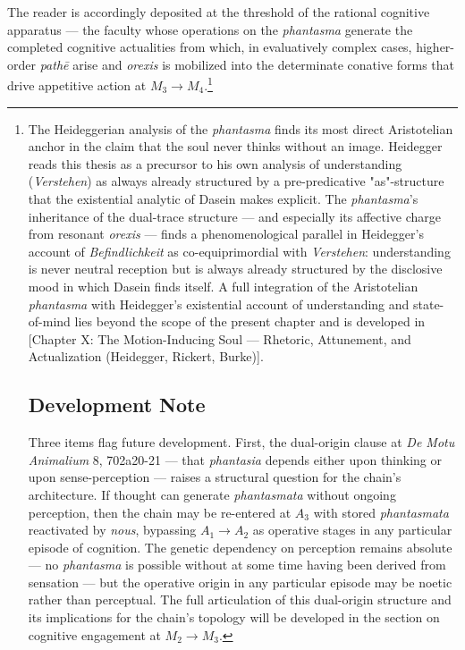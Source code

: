 \documentclass[12pt]{article}
\begin{document}
The reader is accordingly deposited at the threshold of the rational cognitive apparatus --- the faculty whose operations on the \textit{phantasma} generate the completed cognitive actualities from which, in evaluatively complex cases, higher-order \textit{pathē} arise and \textit{orexis} is mobilized into the determinate conative forms that drive appetitive action at $M_3$$\to$$M_4$.\footnote{The Heideggerian analysis of the \textit{phantasma} finds its most direct Aristotelian anchor in the claim that the soul never thinks without an image. Heidegger reads this thesis as a precursor to his own analysis of understanding (\textit{Verstehen}) as always already structured by a pre-predicative "as"-structure that the existential analytic of Dasein makes explicit. The \textit{phantasma}'s inheritance of the dual-trace structure --- and especially its affective charge from resonant \textit{orexis} --- finds a phenomenological parallel in Heidegger's account of \textit{Befindlichkeit} as co-equiprimordial with \textit{Verstehen}: understanding is never neutral reception but is always already structured by the disclosive mood in which Dasein finds itself. A full integration of the Aristotelian \textit{phantasma} with Heidegger's existential account of understanding and state-of-mind lies beyond the scope of the present chapter and is developed in [Chapter X: The Motion-Inducing Soul --- Rhetoric, Attunement, and Actualization (Heidegger, Rickert, Burke)].

\subsection*{Development Note}

Three items flag future development. First, the dual-origin clause at \textit{De Motu Animalium} 8, 702a20-21 --- that \textit{phantasia} depends either upon thinking or upon sense-perception --- raises a structural question for the chain's architecture. If thought can generate \textit{phantasmata} without ongoing perception, then the chain may be re-entered at $A_3$ with stored \textit{phantasmata} reactivated by \textit{nous}, bypassing $A_1$$\to$$A_2$ as operative stages in any particular episode of cognition. The genetic dependency on perception remains absolute --- no \textit{phantasma} is possible without at some time having been derived from sensation --- but the operative origin in any particular episode may be noetic rather than perceptual. The full articulation of this dual-origin structure and its implications for the chain's topology will be developed in the section on cognitive engagement at $M_2$$\to$$M_3$.

}
\end{document}
